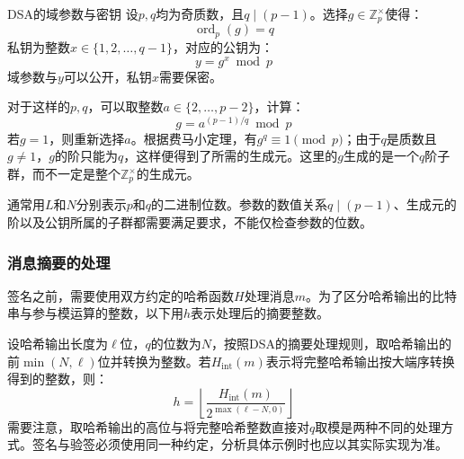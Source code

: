 \documentclass{book}
\numberwithin{equation}{subsubsection}
\begin{document}
\begin{concept}{DSA的域参数与密钥}
    设$p,q$均为奇质数，且$q\mid(p-1)$。选择$g\in\mathbb{Z}_p^{\times}$使得：
    \begin{equation}
        \operatorname{ord}_p(g)=q
        \nonumber
    \end{equation}
    私钥为整数$x\in\{1,2,\ldots,q-1\}$，对应的公钥为：
    \begin{equation}
        y=g^x\bmod p
        \nonumber
    \end{equation}
    域参数与$y$可以公开，私钥$x$需要保密。\par
\end{concept}

对于这样的$p,q$，可以取整数$a\in\{2,\ldots,p-2\}$，计算：
\begin{equation}
    g=a^{(p-1)/q}\bmod p
    \nonumber
\end{equation}
若$g=1$，则重新选择$a$。根据费马小定理，有$g^q\equiv1\pmod p$；由于$q$是质数且$g\ne1$，$g$的阶只能为$q$，这样便得到了所需的生成元。这里的$g$生成的是一个$q$阶子群，而不一定是整个$\mathbb{Z}_p^{\times}$的生成元。\par

通常用$L$和$N$分别表示$p$和$q$的二进制位数。参数的数值关系$q\mid(p-1)$、生成元的阶以及公钥所属的子群都需要满足要求，不能仅检查参数的位数。\par

\subsubsection{消息摘要的处理}
签名之前，需要使用双方约定的哈希函数$H$处理消息$m$。为了区分哈希输出的比特串与参与模运算的整数，以下用$h$表示处理后的摘要整数。\par
设哈希输出长度为$\ell$位，$q$的位数为$N$，按照DSA的摘要处理规则，取哈希输出的前$\min(N,\ell)$位并转换为整数。若$H_{\mathrm{int}}(m)$表示将完整哈希输出按大端序转换得到的整数，则：
\begin{equation}
    h=\left\lfloor\frac{H_{\mathrm{int}}(m)}{2^{\max(\ell-N,0)}}\right\rfloor
    \nonumber
\end{equation}
需要注意，取哈希输出的高位与将完整哈希整数直接对$q$取模是两种不同的处理方式。签名与验签必须使用同一种约定，分析具体示例时也应以其实际实现为准。\par
\end{document}
